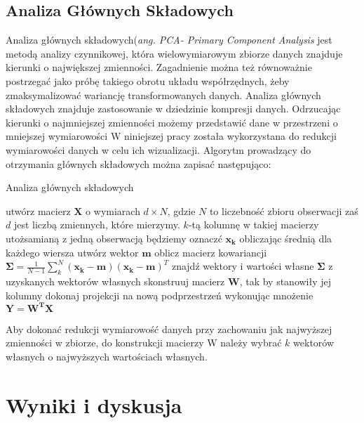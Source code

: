 \documentclass{article}
\begin{document}
\subsection{Analiza Głównych Składowych}
\label{pca_rozdzial}
Analiza głównych składowych(\textit{ang. PCA- Primary Component Analysis} jest metodą analizy czynnikowej, która wielowymiarowym zbiorze danych znajduje kierunki o największej zmienności.
Zagadnienie można też równoważnie postrzegać jako próbę takiego obrotu układu współrzędnych, żeby zmaksymalizować wariancję transformowanych danych.
Analiza głównych składowych znajduje zastosowanie w dziedzinie kompresji danych.
Odrzucając kierunki o najmniejszej zmienności możemy przedstawić dane w przestrzeni o mniejszej wymiarowości
W niniejszej pracy została wykorzystana do redukcji wymiarowości danych w celu ich wizualizacji.
Algorytm prowadzący do otrzymania głównych składowych można zapisać następująco:

\begin{algorithm}
\label{pca}
\caption{Analiza głównych składowych}
\begin{algorithmic}[1]
\STATE utwórz macierz $\textbf{X}$ o wymiarach $d \times N$, gdzie $N$ to liczebność zbioru obserwacji zaś $d$ jest liczbą zmiennych, które mierzymy. $k$-tą kolumnę w takiej macierzy utożsamianą z jedną obserwacją będziemy oznaczć $\mathbf{x_k}$
\STATE obliczając średnią dla każdego wiersza utwórz wektor $\textbf{m}$
\STATE oblicz macierz kowariancji $\mathbf{\Sigma} = \frac{1}{N-1}\sum\limits_k^N(\mathbf{x_k - m})(\mathbf{x_k - m})^T$
\STATE znajdź wektory i wartości własne $\mathbf{\Sigma}$
\STATE z uzyskanych wektorów własnych skonstruuj macierz \textbf{W}, tak by stanowiły jej kolumny
\STATE dokonaj projekcji na nową podprzestrzeń wykonując mnożenie $\mathbf{Y = W^TX}$
\end{algorithmic}
\end{algorithm}
Aby dokonać redukcji wymiarowość danych przy zachowaniu jak najwyższej zmienności w zbiorze, do konstrukcji macierzy W należy wybrać $k$ wektorów własnych o najwyższych wartościach własnych.

\section{Wyniki i dyskusja}
\end{document}
